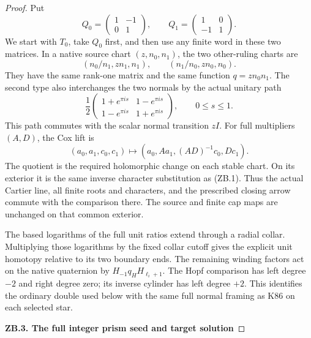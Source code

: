 \begin{proof}
Put
\[
Q_0=\begin{pmatrix}1&-1\\0&1\end{pmatrix},\qquad
Q_1=\begin{pmatrix}1&0\\-1&1\end{pmatrix}.
\]
We start with \(T_0\), take \(Q_0\) first, and then use any finite
word in these two matrices. In a native source chart
\((z,n_0,n_1)\), the two other-ruling charts are
\[
(n_0/n_1,zn_1,n_1),\qquad(n_1/n_0,zn_0,n_0).              \tag{ZB.2}
\]
They have the same rank-one matrix and the same function
\(q=zn_0n_1\). The second type also interchanges the two normals by
the actual unitary path
\[
\frac12\begin{pmatrix}
1+e^{\pi is}&1-e^{\pi is}\\1-e^{\pi is}&1+e^{\pi is}
\end{pmatrix},\qquad 0\le s\le1.                         \tag{ZB.3}
\]
This path commutes with the scalar normal transition \(zI\).
For full multipliers \((A,D)\), the Cox lift is
\[
(a_0,a_1,c_0,c_1)\longmapsto
(a_0,Aa_1,(AD)^{-1}c_0,Dc_1).                            \tag{ZB.4}
\]
The quotient is the required holomorphic change on each stable chart.
On its exterior it is the same inverse character substitution as
(ZB.1). Thus the actual Cartier line, all finite roots and characters,
and the prescribed closing arrow commute with the comparison there.
The source and finite cap maps are unchanged on that common exterior.

The based logarithms of the full unit ratios extend through a radial
collar. Multiplying those logarithms by the fixed collar cutoff gives
the explicit unit homotopy relative to its two boundary ends. The
remaining winding factors act on the native quaternion by
\(H_{-1}q_HH_{\ell_i+1}\). The Hopf comparison has left degree
\(-2\) and right degree zero; its inverse cylinder has left degree
\(+2\). This identifies the ordinary double used below with the
same full normal framing as K86 on each selected star.

\par

\medskip\noindent\textbf{ZB.3. The full integer prism seed and target solution}

\par\nopagebreak[4]


\end{proof}
